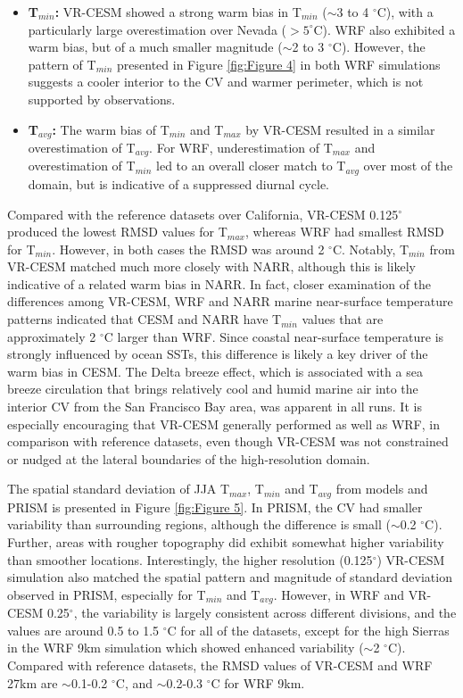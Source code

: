 \documentclass[draft,ms]{agutex}   %
\begin{document}
\begin{article}
\begin{itemize}
\item{} \textbf{T$_{min}$:}  VR-CESM showed a strong warm bias in T$_{min}$ ($\sim$3 to 4 $^\circ$C), with a particularly large overestimation over Nevada ($> 5 ^\circ$C). WRF also exhibited a warm bias, but of a much smaller magnitude ($\sim$2 to 3 $^\circ$C). However, the pattern of T$_{min}$ presented in Figure \ref{fig:Figure 4} in both WRF simulations suggests a cooler interior to the CV and warmer perimeter, which is not supported by observations.

\item{} \textbf{T$_{avg}$:}  The warm bias of T$_{min}$ and T$_{max}$ by VR-CESM resulted in a similar overestimation of T$_{avg}$. For WRF, underestimation of T$_{max}$ and overestimation of T$_{min}$ led to an overall closer match to T$_{avg}$ over most of the domain, but is indicative of a suppressed diurnal cycle.
\end{itemize}

Compared with the reference datasets over California, VR-CESM 0.125$^\circ$ produced the lowest RMSD values for T$_{max}$, whereas WRF had smallest RMSD for T$_{min}$.  However, in both cases the RMSD was around 2 $^\circ$C.  Notably, T$_{min}$ from VR-CESM matched much more closely with NARR, although this is likely indicative of a related warm bias in NARR.  In fact, closer examination of the differences among VR-CESM, WRF and NARR marine near-surface temperature patterns indicated that CESM and NARR have T$_{min}$ values that are approximately 2 $^\circ$C larger than WRF.  Since coastal near-surface temperature is strongly influenced by ocean SSTs, this difference is likely a key driver of the warm bias in CESM. The Delta breeze effect, which is associated with a sea breeze circulation that brings relatively cool and humid marine air into the interior CV from the San Francisco Bay area, was apparent in all runs. It is especially encouraging that VR-CESM generally performed as well as WRF, in comparison with reference datasets, even though VR-CESM was not constrained or nudged at the lateral boundaries of the high-resolution domain.

The spatial standard deviation of JJA T$_{max}$, T$_{min}$ and T$_{avg}$ from models and PRISM is presented in Figure \ref{fig:Figure 5}. In PRISM, the CV had smaller variability than surrounding regions, although the difference is small ($\sim$0.2 $^\circ$C). Further, areas with rougher topography did exhibit somewhat higher variability than smoother locations. Interestingly, the higher resolution (0.125$^\circ$) VR-CESM simulation also matched the spatial pattern and magnitude of standard deviation observed in PRISM, especially for T$_{min}$ and T$_{avg}$. However, in WRF and VR-CESM 0.25$^\circ$, the variability is largely consistent across different divisions, and the values are around 0.5 to 1.5 $^\circ$C for all of the datasets, except for the high Sierras in the WRF 9km simulation which showed enhanced variability ($\sim$2 $^\circ$C). Compared with reference datasets, the RMSD values of VR-CESM and WRF 27km are $\sim$0.1-0.2 $^\circ$C, and $\sim$0.2-0.3 $^\circ$C for WRF 9km.


\end{article}
\end{document}
